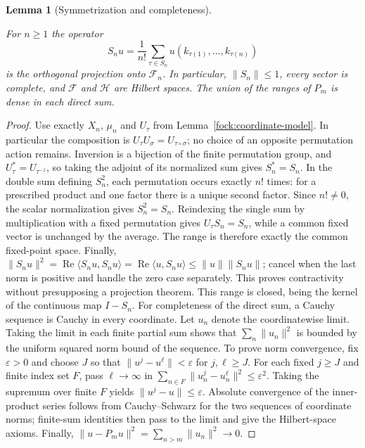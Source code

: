 \documentclass[11pt,a4paper]{article}
\newtheorem{lemma}[theorem]{Lemma}
\theoremstyle{definition}
\theoremstyle{remark}
\newcommand{\proofid}[1]{\par\smallskip{\normalfont\scriptsize\color{inkblue}Stable ID: \nolinkurl{#1}}\par\smallskip}
\begin{document}
\begin{lemma}[Symmetrization and completeness]\label{fock:symmetrization}
\proofid{fock:symmetrization}
\par{}\par\smallskip

For $n\geq1$ the operator
\[
 S_nu=\frac1{n!}\sum_{\tau\in S_n}
                u(k_{\tau(1)},\ldots,k_{\tau(n)})
\]
is the orthogonal projection onto $\mathcal F_n$. In particular,
$\|S_n\|\leq1$, every sector is complete, and $\mathcal F$ and
$\mathcal H$ are Hilbert spaces. The union of the ranges of $P_m$
is dense in each direct sum.
\end{lemma}
\begin{proof}
Use exactly $X_n$, $\mu_n$ and $U_\tau$ from
Lemma~\ref{fock:coordinate-model}. In particular the composition
is $U_\tau U_\sigma=U_{\tau\circ\sigma}$; no choice of an
opposite permutation action remains. Inversion is a bijection
of the finite permutation group, and $U_\tau^*=U_{\tau^{-1}}$,
so taking the adjoint of its normalized sum gives $S_n^*=S_n$.
In the double sum defining $S_n^2$,
each permutation occurs exactly $n!$ times: for a prescribed product
and one factor there is a unique second factor. Since $n!\ne0$,
the scalar normalization gives $S_n^2=S_n$. Reindexing the single
sum by multiplication with a fixed permutation gives
$U_\tau S_n=S_n$, while a common fixed vector is unchanged by the
average. The range is therefore exactly the common fixed-point
space. Finally,
$\|S_nu\|^2=\operatorname{Re}\langle S_nu,S_nu\rangle
=\operatorname{Re}\langle u,S_nu\rangle\leq\|u\|\|S_nu\|$; cancel when the
last norm is positive and handle the zero case separately. This
proves contractivity without presupposing a projection theorem.
This range is closed, being the kernel of the continuous map $I-S_n$.
For completeness of the direct sum, a Cauchy sequence is Cauchy in every
coordinate. Let $u_n$ denote the coordinatewise limit. Taking the limit in
each finite partial sum shows that $\sum_n\|u_n\|^2$ is bounded by the
uniform squared norm bound of the sequence. To prove norm convergence,
fix $\varepsilon>0$ and choose $J$ so that
$\|u^j-u^\ell\|<\varepsilon$ for $j,\ell\geq J$. For each fixed
$j\geq J$ and finite index set $F$, pass $\ell\to\infty$ in
$\sum_{n\in F}\|u^j_n-u^\ell_n\|^2\leq\varepsilon^2$.
Taking the supremum over finite $F$ yields
$\|u^j-u\|\leq\varepsilon$. Absolute convergence of the inner-product
series follows from Cauchy--Schwarz for the two sequences of
coordinate norms; finite-sum identities then pass to the limit and
give the Hilbert-space axioms. Finally,
$\|u-P_mu\|^2=\sum_{n>m}\|u_n\|^2\to0$.
\end{proof}
\end{document}
